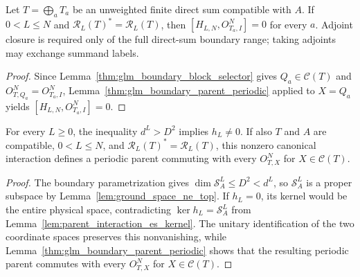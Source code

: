 \begin{lemma}
    \label{thm:glm_boundary_parent_blocks}
    \leanok
    Let $T=\bigoplus_a T_a$ be an unweighted finite direct sum compatible
    with $A$. If $0<L\leq N$ and $\mathcal R_L(T)^*=\mathcal R_L(T)$,
    then $[H_{L,N},O^N_{T_a,I}]=0$ for every $a$.
    Adjoint closure is required only of the full direct-sum boundary range;
    taking adjoints may exchange summand labels.
\end{lemma}
\begin{proof}
    \leanok
    Since Lemma~\ref{thm:glm_boundary_block_selector} gives
    $Q_a\in\mathcal C(T)$ and $O^N_{T,Q_a}=O^N_{T_a,I}$,
    Lemma~\ref{thm:glm_boundary_parent_periodic} applied to $X=Q_a$ yields
    $[H_{L,N},O^N_{T_a,I}]=0$.
\end{proof}

\begin{lemma}
    \label{thm:glm_boundary_parent_nonzero}
    \leanok
    For every $L\geq0$, the inequality $d^L>D^2$ implies $h_L\ne0$.
    If also $T$ and $A$ are compatible, $0<L\leq N$, and
    $\mathcal R_L(T)^*=\mathcal R_L(T)$, this nonzero canonical
    interaction defines a periodic parent commuting with every
    $O^N_{T,X}$ for $X\in\mathcal C(T)$.
\end{lemma}
\begin{proof}
    \leanok
    The boundary parametrization gives $\dim\mathcal S_A^L\leq D^2<d^L$,
    so $\mathcal S_A^L$ is a proper subspace by
    Lemma~\ref{lem:ground_space_ne_top}. If $h_L=0$, its kernel
    would be the entire physical space, contradicting
    $\ker h_L=\mathcal S_A^L$ from
    Lemma~\ref{lem:parent_interaction_es_kernel}. The unitary identification
    of the two coordinate spaces preserves this nonvanishing, while
    Lemma~\ref{thm:glm_boundary_parent_periodic} shows that the resulting
    periodic parent commutes with every $O^N_{T,X}$ for $X\in\mathcal C(T)$.
\end{proof}

